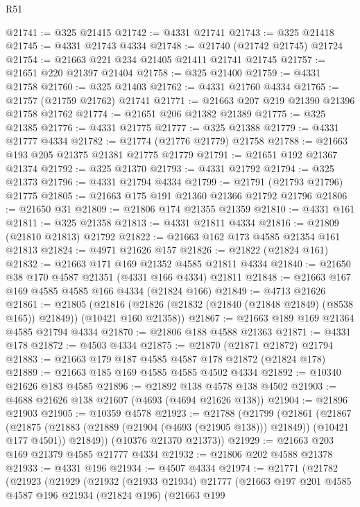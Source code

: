 \begin{lexlean}{R51}
\begin{coremodule}
@21741 := @325 @21415
@21742 := @4331 @21741
@21743 := @325 @21418
@21745 := @4331 @21743 @4334
@21748 := @21740 (@21742 @21745) @21724
@21754 := @21663 @221 @234 @21405 @21411 @21741 @21745
@21757 := @21651 @220 @21397 @21404
@21758 := @325 @21400
@21759 := @4331 @21758
@21760 := @325 @21403
@21762 := @4331 @21760 @4334
@21765 := @21757 (@21759 @21762) @21741
@21771 := @21663 @207 @219 @21390 @21396 @21758 @21762
@21774 := @21651 @206 @21382 @21389
@21775 := @325 @21385
@21776 := @4331 @21775
@21777 := @325 @21388
@21779 := @4331 @21777 @4334
@21782 := @21774 (@21776 @21779) @21758
@21788 := @21663 @193 @205 @21375 @21381 @21775 @21779
@21791 := @21651 @192 @21367 @21374
@21792 := @325 @21370
@21793 := @4331 @21792
@21794 := @325 @21373
@21796 := @4331 @21794 @4334
@21799 := @21791 (@21793 @21796) @21775
@21805 := @21663 @175 @191 @21360 @21366 @21792 @21796
@21806 := @21650 @31
@21809 := @21806 @174 @21355 @21359
@21810 := @4331 @161
@21811 := @325 @21358
@21813 := @4331 @21811 @4334
@21816 := @21809 (@21810 @21813) @21792
@21822 := @21663 @162 @173 @4585 @21354 @161 @21813
@21824 := @4971 @21626 @157
@21826 := @21822 (@21824 @161)
@21832 := @21663 @171 @169 @21352 @4585 @21811 @4334
@21840 := @21650 @38 @170 @4587 @21351 (@4331 @166 @4334) @21811
@21848 := @21663 @167 @169 @4585 @4585 @166 @4334 (@21824 @166)
@21849 := @4713 @21626
@21861 := @21805
    (@21816 (@21826 (@21832 (@21840 (@21848 @21849) (@8538 @165)) @21849)) (@10421 @160 @21358))
@21867 := @21663 @189 @169 @21364 @4585 @21794 @4334
@21870 := @21806 @188 @4588 @21363
@21871 := @4331 @178
@21872 := @4503 @4334
@21875 := @21870 (@21871 @21872) @21794
@21883 := @21663 @179 @187 @4585 @4587 @178 @21872 (@21824 @178)
@21889 := @21663 @185 @169 @4585 @4585 @4502 @4334
@21892 := @10340 @21626 @183 @4585
@21896 := @21892 @138 @4578 @138 @4502
@21903 := @4688 @21626 @138 @21607 (@4693 (@4694 @21626 @138))
@21904 := @21896 @21903
@21905 := @10359 @4578
@21923 := @21788
    (@21799
      (@21861
        (@21867
          (@21875 (@21883 (@21889 (@21904 (@4693 (@21905 @138))) @21849)) (@10421 @177 @4501))
          @21849))
      (@10376 @21370 @21373))
@21929 := @21663 @203 @169 @21379 @4585 @21777 @4334
@21932 := @21806 @202 @4588 @21378
@21933 := @4331 @196
@21934 := @4507 @4334
@21974 := @21771
    (@21782
      (@21923
        (@21929
          (@21932
            (@21933 @21934)
            @21777
            (@21663
              @197
              @201
              @4585
              @4587
              @196
              @21934
              (@21824 @196)
              (@21663
                @199

\end{coremodule}
\end{lexlean}
